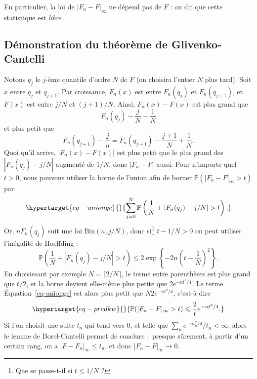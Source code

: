 \documentclass[
  10,
  letterpaper,
  DIV=11,
  numbers=noendperiod]{scrreport}
\theoremstyle{plain}
\theoremstyle{definition}
\theoremstyle{plain}
\theoremstyle{definition}
\theoremstyle{definition}
\theoremstyle{plain}
\theoremstyle{remark}
\begin{document}
En particulier, la loi de \(|F_n - F|_\infty\) ne dépend pas de \(F\) :
on dit que cette statistique est \emph{libre}.

\hypertarget{duxe9monstration-du-thuxe9oruxe8me-de-glivenko-cantelli}{%
\subsection*{Démonstration du théorème de
Glivenko-Cantelli}\label{duxe9monstration-du-thuxe9oruxe8me-de-glivenko-cantelli}}

Notons \(q_j\) le \(j\)-ème quantile d'ordre \(N\) de \(F\) (on choisira
l'entier \(N\) plus tard). Soit \(x\) entre \(q_j\) et \(q_{j+1}\). Par
croissance, \(F_n(x)\) est entre \(F_n(q_j)\) et \(F_n(q_{j+1})\), et
\(F(x)\) est entre \(j/N\) et \((j+1)/N\). Ainsi, \(F_n(x) - F(x)\) est
plus grand que \[ F_n(q_j) - \frac{j}{N} - \frac{1}{N}\] et plus petit
que
\[ F_n(q_{j+1})- \frac{j}{n} = F_n(q_{j+1})- \frac{j+1}{N}  + \frac{1}{N}.\]
Quoi qu'il arrive, \(|F_n(x) - F(x)|\) est plus petit que le plus grand
des \(|F_n(q_j) - j/N|\) augmenté de \(1/N\), donc \(|F_n - F|\) aussi.
Pour n'importe quel \(t>0\), nous pouvons utiliser la borne de l'union
afin de borner \(\mathbb{P}(|F_n - F|_\infty > t)\) par
\begin{equation}\protect\hypertarget{eq-uniongc}{}{\sum_{j=0}^N\mathbb{P}\left(\frac{1}{N} + |F_n(q_j) - j/N|>t\right).}\label{eq-uniongc}\end{equation}
Or, \(nF_n(q_j)\) suit une loi \(\mathrm{Bin}(n, j/N)\), donc
si\footnote{Que se passe-t-il si \(t\leqslant 1/N\) ?} \(t-1/N>0\) on
peut utiliser l'inégalité de Hoeffding :~
\[\mathbb{P}\left(\frac{1}{N} + |F_n(q_j) - j/N|>t\right) \leqslant 2\exp\left\lbrace - 2 n\left(t - \frac{1}{N}\right)^2 \right\rbrace.\]
En choisissant par exemple \(N = \lceil 2/N\rceil\), le terme entre
parenthèses est plus grand que \(t/2\), et la borne devient elle-même
plus petite que \(2e^{-nt^2/4}\). Le terme Équation~\ref{eq-uniongc} est
alors plus petit que \(N 2e^{-nt^2/4}\), c'est-à-dire
\begin{equation}\protect\hypertarget{eq-predkw}{}{\mathbb{P}(|F_n - F|_\infty > t) \leqslant \frac{2}{t}e^{-nt^2/4}.}\label{eq-predkw}\end{equation}
Si l'on choisit une suite \(t_n\) qui tend vers 0, et telle que
\(\sum_n e^{-nt_n^2/4}/t_n < \infty\), alors le lemme de Borel-Cantelli
permet de conclure :~presque sûrement, à partir d'un certain rang, on a
\(|F - F_n|_\infty \leqslant t_n\), et donc \(|F_n - F|_\infty \to 0\).
\end{document}
